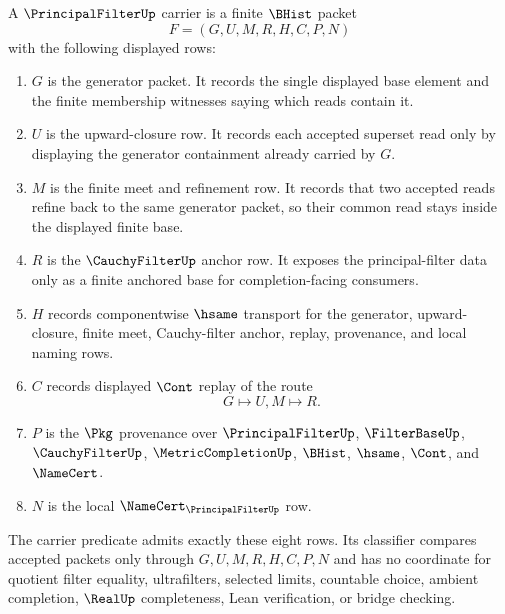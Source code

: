 \begin{definition}
\label{def:principal-filter-carrier}
A $\PrincipalFilterUp$ carrier is a finite $\BHist$ packet
$$
F=(G,U,M,R,H,C,P,N)
$$
with the following displayed rows:
\begin{enumerate}
\item $G$ is the generator packet. It records the single displayed base element and the finite membership witnesses saying which reads contain it.
\item $U$ is the upward-closure row. It records each accepted superset read only by displaying the generator containment already carried by $G$.
\item $M$ is the finite meet and refinement row. It records that two accepted reads refine back to the same generator packet, so their common read stays inside the displayed finite base.
\item $R$ is the $\CauchyFilterUp$ anchor row. It exposes the principal-filter data only as a finite anchored base for completion-facing consumers.
\item $H$ records componentwise $\hsame$ transport for the generator, upward-closure, finite meet, Cauchy-filter anchor, replay, provenance, and local naming rows.
\item $C$ records displayed $\Cont$ replay of the route
$$
G \longmapsto U,M \longmapsto R .
$$
\item $P$ is the $\Pkg$ provenance over $\PrincipalFilterUp$, $\FilterBaseUp$, $\CauchyFilterUp$, $\MetricCompletionUp$, $\BHist$, $\hsame$, $\Cont$, and $\NameCert$.
\item $N$ is the local $\NameCert_{\PrincipalFilterUp}$ row.
\end{enumerate}
The carrier predicate admits exactly these eight rows. Its classifier compares accepted packets only through $G,U,M,R,H,C,P,N$ and has no coordinate for quotient filter equality, ultrafilters, selected limits, countable choice, ambient completion, $\RealUp$ completeness, Lean verification, or bridge checking.
\end{definition}

